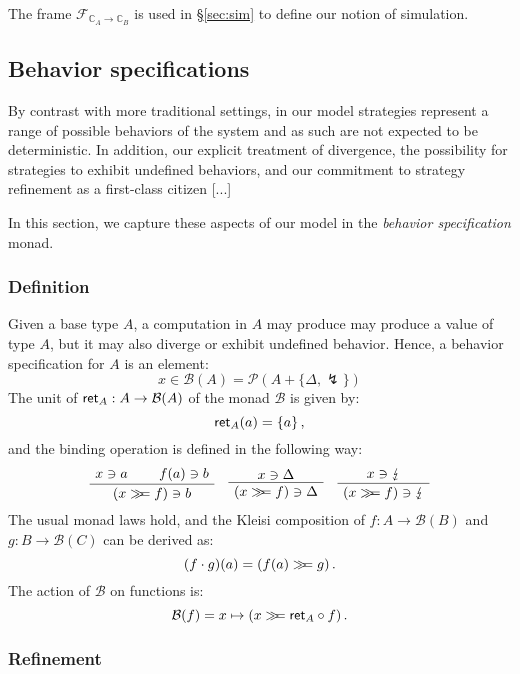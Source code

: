 The frame $\mathcal{F}_{\mathbb{C}_A \rightarrow \mathbb{C}_B}$
is used in \S\ref{sec:sim}
to define our notion of simulation.



\subsection{Behavior specifications} %

By contrast with more traditional settings,
in our model strategies represent a range of possible behaviors
of the system and as such are not expected to be deterministic.
In addition,
our explicit treatment of divergence,
the possibility for strategies to exhibit undefined behaviors,
and our commitment to strategy refinement as a first-class citizen
[...]

In this section,
we capture these aspects of our model
in the \emph{behavior specification} monad.

\subsubsection{Definition}

Given a base type $A$,
a computation in $A$ may produce 
may produce a value of type $A$,
but it may also diverge or exhibit undefined behavior.
Hence,
a behavior specification for $A$ is an element:
\[
    x \in \mathcal{B}(A) = \mathcal{P}(A + \{ \Delta, \lightning \})
\]
The unit of $ \mathsf{ret} _A : A \rightarrow \mathcal{B}(A)$
of the monad $\mathcal{B}$ is given by:
\[
     \mathsf{ret} _A(a) = \{ a \} \,,
\]
and the binding operation is defined in the following way:
\[
    \AxiomC{$x \ni a$}
    \AxiomC{$f(a) \ni b$}
    \BinaryInfC{$(x \bind f) \ni b$}
    \DisplayProof
    \quad
    \AxiomC{$x \ni \Delta$}
    \UnaryInfC{$(x \bind f) \ni \Delta$}
    \DisplayProof
    \quad
    \AxiomC{$x \ni \lightning$}
    \UnaryInfC{$(x \bind f) \ni \lightning$}
    \DisplayProof
\]
The usual monad laws hold, and
the Kleisi composition of $f : A \rightarrow \mathcal{B}(B)$ and
$g : B \rightarrow \mathcal{B}(C)$ can be derived as:
\[
    (f \cdot g)(a) = (f(a) \gg\!\!= g) \,.
\]
The action of $\mathcal{B}$ on functions is:
\[
    \mathcal{B}(f) = x \mapsto (x \gg\!\!=  \mathsf{ret} _A \circ f) \,.
\]


\subsubsection{Refinement}

